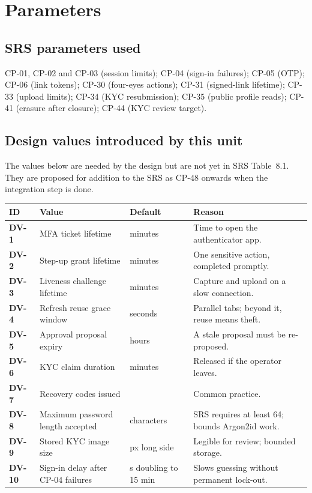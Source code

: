 \documentclass[11pt,a4paper]{article}
\newenvironment{dtable}[1]{\small\begin{longtable}{#1}}{\end{longtable}}
\begin{document}
\section{Parameters}
\subsection{SRS parameters used}
CP-01, CP-02 and CP-03 (session limits); CP-04 (sign-in failures); CP-05 (OTP); CP-06 (link tokens); CP-30 (four-eyes actions); CP-31 (signed-link lifetime); CP-33 (upload limits); CP-34 (KYC resubmission); CP-35 (public profile reads); CP-41 (erasure after closure); CP-44 (KYC review target).

\subsection{Design values introduced by this unit}
The values below are needed by the design but are not yet in SRS Table~8.1. They are proposed for addition to the SRS as CP-48 onwards when the integration step is done.
\begin{dtable}{@{}>{\bfseries}p{1.2cm}>{\raggedright\arraybackslash}p{6.2cm}>{\raggedright\arraybackslash}p{2.6cm}>{\raggedright\arraybackslash}p{5.2cm}@{}}
\toprule
\textnormal{\textbf{ID}} & \textbf{Value} & \textbf{Default} & \textbf{Reason} \\ \midrule \endhead
DV-1 & MFA ticket lifetime & 5 minutes & Time to open the authenticator app. \\
DV-2 & Step-up grant lifetime & 5 minutes & One sensitive action, completed promptly. \\
DV-3 & Liveness challenge lifetime & 10 minutes & Capture and upload on a slow connection. \\
DV-4 & Refresh reuse grace window & 10 seconds & Parallel tabs; beyond it, reuse means theft. \\
DV-5 & Approval proposal expiry & 72 hours & A stale proposal must be re-proposed. \\
DV-6 & KYC claim duration & 30 minutes & Released if the operator leaves. \\
DV-7 & Recovery codes issued & 10 & Common practice. \\
DV-8 & Maximum password length accepted & 256 characters & SRS requires at least 64; bounds Argon2id work. \\
DV-9 & Stored KYC image size & 2000 px long side & Legible for review; bounded storage. \\
DV-10 & Sign-in delay after CP-04 failures & 1 s doubling to 15 min & Slows guessing without permanent lock-out. \\
\bottomrule
\end{dtable}
\end{document}
